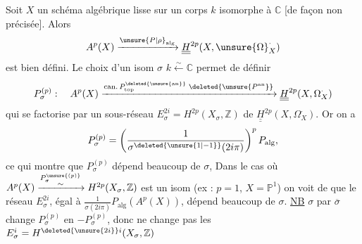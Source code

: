Soit $X$ un schéma algébrique lisse sur  un corps $k$ isomorphe à $\mathbb C$ \unsure{(}[de façon non précisée]. Alors
\[
 A^p(X)\xrightarrow{\unsure{P|\rho}_{\mathrm{alg}}}
 \underline{\underline H}^{2p}(X,\unsure{\Omega}_X^{\cdot})
\]
est bien défini. Le choix d'un isom $\sigma$ $k\xleftarrow{\sim}\mathbb C$  permet de définir
\[
 P_\sigma^{(p)}:\quad
 A^p(X)\xrightarrow{\mathrm{can.}\,P^{\deleted{\unsure{\mathrm{an}}}}_{\mathrm{top}}\;\deleted{\unsure{P^{\mathrm{an}}}}}
 \underline{\underline H}^{2p}(X,\Omega_X^{\cdot})
\]
qui se factorise par un sous-réseau $E_\sigma^{2i}=H^{2p}(X_\sigma,\mathbb Z)$ de $\underline{\underline H}^{2p}(X,\Omega_X^{\cdot})$. Or on a
\[
 P_\sigma^{(p)}=\left(\frac{1}{\sigma^{\deleted{\unsure{1|-1}}}(2i\pi)}\right)^p P_{\mathrm{alg}},
\]
ce qui montre que $P_\sigma^{(p)}$ dépend beaucoup de $\sigma$,  Dans le cas où $A^p(X)\xrightarrow{\substack{P_\sigma^{\unsure{(p)}}\\\sim}}H^{2p}(X_\sigma,\mathbb Z)$ est un isom (ex : $p=1$, $X=\mathbb P^1$) on voit de  que le réseau $E_\sigma^{2i}$, égal à $\frac{1}{\sigma(2i\pi)}P_{\mathrm{alg}}(A^p(X))$, dépend beaucoup de $\sigma$. \uline{NB}  $\sigma$ par $\overline{\sigma}$ change $P_\sigma^{(p)}$ en $-P_\sigma^{(p)}$, donc ne change pas les $E_\sigma^i=H^{\deleted{\unsure{2i}}i}(X_\sigma,\mathbb Z)$

